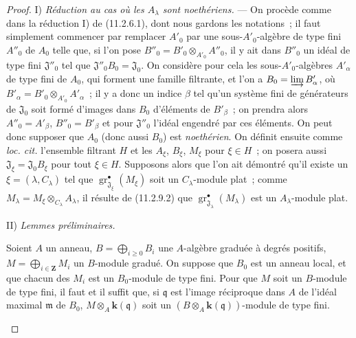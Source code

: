\begin{proof}
\medskip
\noindent I) \emph{Réduction au cas où les $A_\lambda$ sont
noethériens.} --- On procède comme dans la réduction I) de (11.2.6.1), dont
nous gardons les notations~; il faut simplement commencer par remplacer
$A'_0$ par une sous-$A'_0$-algèbre de type fini $A''_0$ de $A_0$ telle que,
si l'on pose $B''_0=B'_0\otimes_{A'_0}A''_0$, il y ait dans $B''_0$ un idéal
de type fini $\mathfrak J''_0$ tel que $\mathfrak J''_0B_0=\mathfrak J_0$.
On considère pour cela les sous-$A'_0$-algèbres $A'_\alpha$ de type fini de
$A_0$, qui forment une famille filtrante, et l'on a
$B_0=\varinjlim B'_\alpha$, où
$B'_\alpha=B'_0\otimes_{A'_0}A'_\alpha$~; il y a donc un indice $\beta$ tel
qu'un système fini de générateurs de $\mathfrak J_0$ soit formé d'images dans
$B_0$ d'éléments de $B'_\beta$~; on prendra alors $A''_0=A'_\beta$,
$B''_0=B'_\beta$ et pour $\mathfrak J''_0$ l'idéal engendré par ces éléments.
On peut donc supposer que $A_0$ (donc aussi $B_0$) est \emph{noethérien}. On définit
ensuite comme \emph{loc. cit.} l'ensemble filtrant $H$ et les $A_\xi$,
$B_\xi$, $M_\xi$ pour $\xi\in H$~; on posera aussi
$\mathfrak J_\xi=\mathfrak J_0B_\xi$ pour tout $\xi\in H$. Supposons alors
que l'on ait démontré qu'il existe un $\xi=(\lambda,C_\lambda)$ tel que
$\operatorname{gr}_{\mathfrak J_\xi}^\bullet(M_\xi)$ soit un $C_\lambda$-module
plat~; comme $M_\lambda=M_\xi\otimes_{C_\lambda}A_\lambda$, il résulte de
(11.2.9.2) que $\operatorname{gr}_{\mathfrak J_\lambda}^\bullet(M_\lambda)$ est un
$A_\lambda$-module plat.

\medskip
\noindent II) \emph{Lemmes préliminaires.}

\begin{lemma}[11.2.9.3]
\label{IV.11.2.9.3-fr}
Soient $A$ un anneau,
$B=\bigoplus_{i\geq0}B_i$ une $A$-algèbre graduée à degrés positifs,
$M=\bigoplus_{i\in\mathbf Z}M_i$ un $B$-module gradué. On suppose que $B_0$
est un anneau local, et que chacun des $M_i$ est un $B_0$-module de type fini.
Pour que $M$ soit un $B$-module de type fini, il faut et il suffit que, si
$\mathfrak q$ est l'image réciproque dans $A$ de l'idéal maximal $\mathfrak m$
de $B_0$, $M\otimes_A\boldsymbol{k}(\mathfrak q)$ soit un
$(B\otimes_A\boldsymbol{k}(\mathfrak q))$-module de type fini.
\end{lemma}


\end{proof}
